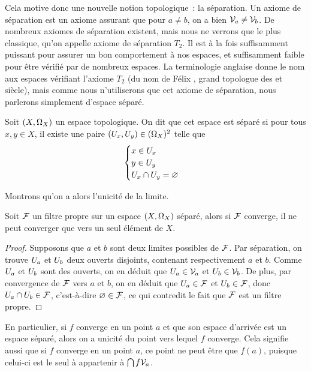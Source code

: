 Cela motive donc une nouvelle notion topologique~: la séparation. Un axiome de
séparation est un axiome assurant que pour $a\neq b$, on a bien
$\mathcal{V}_{a}\neq\mathcal{V}_{b}$. De nombreux axiomes de séparation existent, mais nous
ne verrons que le plus classique, qu'on appelle axiome de séparation $T_2$. Il
est à la fois suffisamment puissant pour assurer un bon comportement à nos
espaces, et suffisamment faible pour être vérifié par de nombreux espaces. La
terminologie anglaise donne le nom  aux espaces vérifiant
l'axiome $T_2$ (du nom de Félix , grand topologue des
 et  siècle), mais comme nous n'utiliserons que cet
axiome de séparation, nous parlerons simplement d'espace séparé.

\begin{definition}
  Soit $(X,\Omega_{X})$ un espace topologique. On dit que cet espace est séparé
  si pour tous $x,y\in X$, il existe une paire
  $(U_x,U_y)\in (\Omega_{X})^2$ telle que
  \[\begin{cases}
  x\in U_x\\
  y\in U_y\\
  U_x\cap U_y = \varnothing
  \end{cases}\]
\end{definition}

\noindent
Montrons qu'on a alors l'unicité de la limite.

\begin{proposition}
  Soit $\mathcal{F}$ un filtre propre sur un espace $(X,\Omega_{X})$ séparé, alors
  si $\mathcal{F}$ converge, il ne peut converger que vers un seul élément de $X$.
\end{proposition}

\begin{proof}
  Supposons que $a$ et $b$ sont deux limites possibles de $\mathcal{F}$. Par
  séparation, on trouve $U_a$ et $U_b$ deux ouverts disjoints,
  contenant respectivement $a$ et $b$. Comme $U_a$ et $U_b$ sont des
  ouverts, on en déduit que $U_a\in\mathcal{V}_{a}$ et $U_b\in\mathcal{V}_{b}$.
  De plus, par convergence de $\mathcal{F}$ vers $a$ et $b$, on en déduit que
  $U_a\in\mathcal{F}$ et $U_b\in\mathcal{F}$, donc
  $U_a\cap U_b\in\mathcal{F}$, c'est-à-dire $\varnothing\in\mathcal{F}$, ce qui
  contredit le fait que $\mathcal{F}$ est un filtre propre.
\end{proof}

En particulier, si $f$ converge en un point $a$ et que son espace d'arrivée est
un espace séparé, alors on a unicité du point vers lequel $f$ converge. Cela
signifie aussi que si $f$ converge en un point $a$, ce point ne peut être que
$f(a)$, puisque celui-ci est le seul à appartenir à $\bigcap f\mathcal{V}_{a}$.

